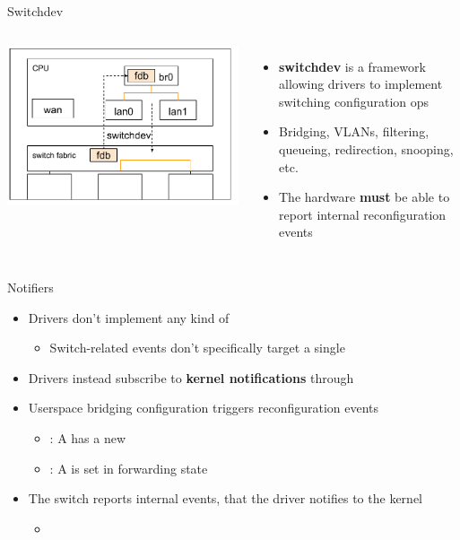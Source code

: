 \begin{frame}{Switchdev}
	\begin{columns}
		\includegraphics[width=\textwidth]{slides/networking-driver-switch/switchdev.pdf}
	\begin{itemize}
		\item \textbf{switchdev} is a framework allowing drivers to implement switching configuration ops
		\item Bridging, VLANs, filtering, queueing, redirection, snooping, etc.
		\item The hardware \textbf{must} be able to report internal reconfiguration events
	\end{itemize}
	\end{columns}
\end{frame}

\begin{frame}{Notifiers}
	\begin{itemize}
		\item Drivers don't implement any kind of 
			\begin{itemize}
				\item Switch-related events don't specifically target a single 
			\end{itemize}
		\item Drivers instead subscribe to \textbf{kernel notifications} through 
		\item Userspace bridging configuration triggers reconfiguration events
			\begin{itemize}
				\item {} : A  has a new 
				\item {} : A  is set in forwarding state
			\end{itemize}
		\item The switch reports internal events, that the driver notifies to the kernel
			\begin{itemize}
				\item {}
			\end{itemize}
	\end{itemize}
\end{frame}

